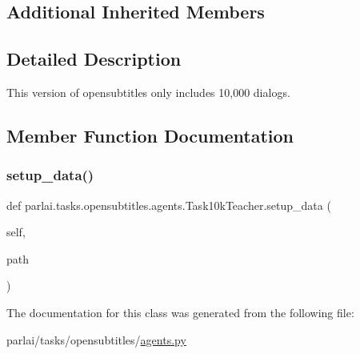 \subsection*{Additional Inherited Members}


\subsection{Detailed Description}
\begin{DoxyVerb}This version of opensubtitles only includes 10,000 dialogs.
\end{DoxyVerb}
 

\subsection{Member Function Documentation}
\mbox{\label{classparlai_1_1tasks_1_1opensubtitles_1_1agents_1_1Task10kTeacher_a2e336eeab89568e9d1bd316e401e9dc1}} 
\subsubsection{\texorpdfstring{setup\+\_\+data()}{setup\_data()}}
{\footnotesize\ttfamily def parlai.\+tasks.\+opensubtitles.\+agents.\+Task10k\+Teacher.\+setup\+\_\+data (\begin{DoxyParamCaption}\item[{}]{self,  }\item[{}]{path }\end{DoxyParamCaption})}



The documentation for this class was generated from the following file\+:\begin{DoxyCompactItemize}
\item 
parlai/tasks/opensubtitles/\hyperlink{parlai_2tasks_2opensubtitles_2agents_8py}{agents.\+py}\end{DoxyCompactItemize}
